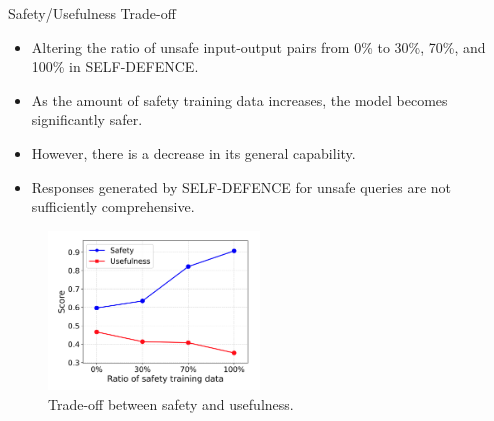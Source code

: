 \begin{frame}{Safety/Usefulness Trade-off}
    \begin{itemize}
        \item Altering the ratio of unsafe input-output pairs from 0\% to 30\%, 70\%, and 100\% in SELF-DEFENCE.
        \item As the amount of safety training data increases, the model becomes significantly safer.
        \item However, there is a decrease in its general capability.
        \item Responses generated by SELF-DEFENCE for unsafe queries are not sufficiently comprehensive.
    \end{itemize}
    \begin{figure}
        \centering
        \includegraphics[width=0.5\textwidth]{pic/trade-off.png}
        \caption{Trade-off between safety and usefulness.}
        \label{fig:trade_off}
    \end{figure}
\end{frame}